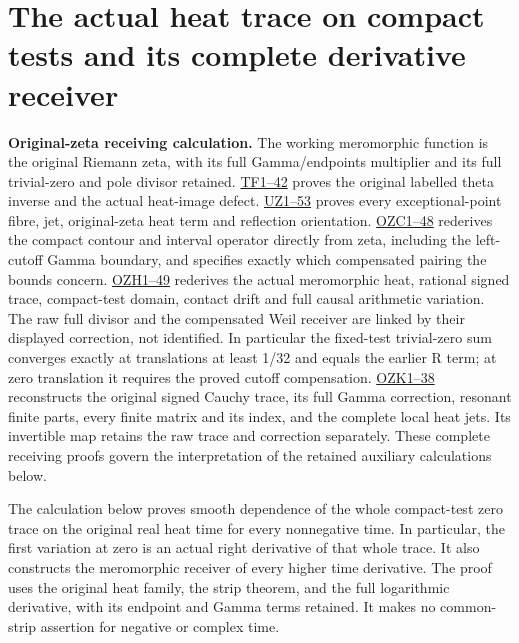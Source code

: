 \documentclass[
  10pt,
  a4paper,
]{article}
\author{}
\date{}
\begin{document}
{
\setcounter{tocdepth}{3}
\tableofcontents
}
\section{The actual heat trace on compact tests and its complete
derivative
receiver}\label{the-actual-heat-trace-on-compact-tests-and-its-complete-derivative-receiver}

\textbf{Original-zeta receiving calculation.} The working meromorphic
function is the original Riemann zeta, with its full Gamma/endpoints
multiplier and its full trivial-zero and pole divisor retained.
\href{FAITHFUL_THETA_COMPLETION_RETURN.md}{TF1--42} proves the original
labelled theta inverse and the actual heat-image defect.
\href{FAITHFUL_UNCOMPLETED_ZETA_HEAT.md}{UZ1--53} proves every
exceptional-point fibre, jet, original-zeta heat term and reflection
orientation.
\href{ORIGINAL_ZETA_COMPACT_WEIL_RECONSTRUCTION.md}{OZC1--48} rederives
the compact contour and interval operator directly from zeta, including
the left-cutoff Gamma boundary, and specifies exactly which compensated
pairing the bounds concern.
\href{ORIGINAL_ZETA_HEAT_CONTACT_RECONSTRUCTION.md}{OZH1--49} rederives
the actual meromorphic heat, rational signed trace, compact-test domain,
contact drift and full causal arithmetic variation. The raw full divisor
and the compensated Weil receiver are linked by their displayed
correction, not identified. In particular the fixed-test trivial-zero
sum converges exactly at translations at least 1/32 and equals the
earlier R term; at zero translation it requires the proved cutoff
compensation. \href{ORIGINAL_ZETA_CAUCHY_RECONSTRUCTION.md}{OZK1--38}
reconstructs the original signed Cauchy trace, its full Gamma
correction, resonant finite parts, every finite matrix and its index,
and the complete local heat jets. Its invertible map retains the raw
trace and correction separately. These complete receiving proofs govern
the interpretation of the retained auxiliary calculations below.

The calculation below proves smooth dependence of the whole compact-test
zero trace on the original real heat time for every nonnegative time. In
particular, the first variation at zero is an actual right derivative of
that whole trace. It also constructs the meromorphic receiver of every
higher time derivative. The proof uses the original heat family, the
strip theorem, and the full logarithmic derivative, with its endpoint
and Gamma terms retained. It makes no common-strip assertion for
negative or complex time.
\end{document}
